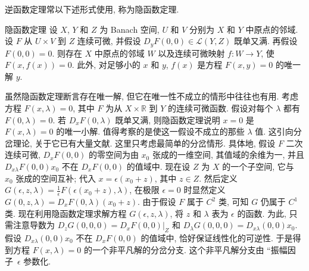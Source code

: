 逆函数定理常以下述形式使用, 称为隐函数定理.

\begin{Theorem}{隐函数定理}
\label{thm:banach-implicit-function}
设 $X$, $Y$ 和 $Z$ 为 Banach 空间, $U$ 和 $V$ 分别为 $X$ 和 $Y$ 中原点的邻域. 设 $F$ 从 $U\times V$ 到 $Z$ 连续可微, 并假设 $D_yF(0,0)\in\mathcal{L}(Y,Z)$ 既单又满. 再假设 $F(0,0)=0$. 则存在 $X$ 中原点的邻域 $W$ 以及连续可微映射 $f:W\to Y$, 使 $F(x,f(x))=0$. 此外, 对足够小的 $x$ 和 $y$, $f(x)$ 是方程 $F(x,y)=0$ 的唯一解 $y$.
\end{Theorem}

\begingroup
\renewcommand{\endProof}{\par\nobreak\hfill$\blacksquare$\par\vspace{0.1cm}}
\endgroup

虽然隐函数定理断言存在唯一解, 但它在唯一性不成立的情形中往往也有用. 考虑方程 $F(x,\lambda)=0$, 其中 $F$ 为从 $X\times\mathbb{R}$ 到 $Y$ 的连续可微函数. 假设对每个 $\lambda$ 都有 $F(0,\lambda)=0$. 若 $D_xF(0,\lambda)$ 既单又满, 则隐函数定理说明 $x=0$ 是 $F(x,\lambda)=0$ 的唯一小解. 值得考察的是使这一假设不成立的那些 $\lambda$ 值. 这引向分岔理论, 关于它已有大量文献. 这里只考虑最简单的分岔情形. 具体地, 假设 $F$ 二次连续可微, $D_xF(0,0)$ 的零空间为由 $x_0$ 张成的一维空间, 其值域的余维为一, 并且 $D_{x\lambda}F(0,0)x_0$ 不在 $D_xF(0,0)$ 的值域中. 现在设 $Z$ 为 $X$ 的一个子空间, 它与 $x_0$ 张成的空间互补; 代入 $x=\epsilon(x_0+z)$, 其中 $z\in Z$. 然后定义 $G(\epsilon,z,\lambda)=\frac{1}{\epsilon}F(\epsilon(x_0+z),\lambda)$, 在极限 $\epsilon=0$ 时显然定义 $G(0,z,\lambda)=D_xF(0,\lambda)(x_0+z)$. 由于假设 $F$ 属于 $C^2$ 类, 可知 $G$ 仍属于 $C^1$ 类. 现在利用隐函数定理求解方程 $G(\epsilon,z,\lambda)$, 将 $z$ 和 $\lambda$ 表为 $\epsilon$ 的函数. 为此, 只需注意导数为 $D_zG(0,0,0)=\left.D_xF(0,0)\right|_Z$ 和 $D_\lambda G(0,0,0)=D_{x\lambda}(0,0)x_0$. 假设 $D_{x\lambda}(0,0)x_0$ 不在 $D_xF(0,0)$ 的值域中, 恰好保证线性化的可逆性. 于是得到方程 $F(x,\lambda)=0$ 的一个非平凡解的分岔分支. 这个非平凡解分支由 ``振幅因子\textquotesingle\textquotesingle\ $\epsilon$ 参数化.
